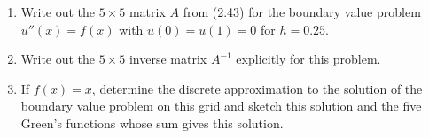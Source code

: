 

\begin{enumerate} 
\item Write out the $5\times 5$
matrix $A$ from (2.43) for the boundary value problem
$u''(x)=f(x)$ with $u(0)=u(1)=0$ for  $h = 0.25$.

\item Write out the $5\times 5$
inverse matrix $A^{-1}$ explicitly for this problem.

\item
If $f(x)=x$, determine the discrete approximation to the solution of the
boundary value problem on this grid and sketch this solution and the five
Green's functions whose sum gives this solution.

\end{enumerate} 
